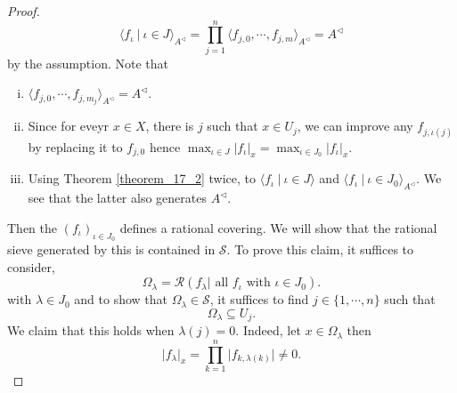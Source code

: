 \documentclass[8pt]{article}
\numberwithin{equation}{section}
\newcommand{\cR}[0]{\mathcal{R}}
\newcommand{\sep}[0]{\:|\:}
\newcommand{\ab}[1]{\vert #1 \vert}
\newcommand{\sS}[0]{\mathscr{S}}
\begin{document}
\begin{proof}
\begin{equation*}
        \langle f_\iota\sep \iota\in J\rangle_{A^\triangleleft} = \prod_{j=1}^n\langle f_{j,0},\cdots,f_{j,m}\rangle_{A^\triangleleft}=A^\triangleleft
    \end{equation*} 
    by the assumption. Note that 
    \begin{enumerate}[i.]
        \item $\langle f_{j,0},\cdots,f_{j,m_j}\rangle_{A^\triangleleft}=A^\triangleleft$.
        \item Since for eveyr $x\in X$, there is $j$ such that $x\in U_j$, we can improve any $f_{j,\iota(j)}$ by replacing it to $f_{j,0}$ hence $\max_{\iota\in J}\ab{f_\iota}_x = \max_{\iota\in J_0}\ab{f_\iota}_x$.
        \item Using Theorem \ref{theorem_17_2} twice, to $\langle f_\iota\sep \iota\in J\rangle$ and $\langle f_\iota\sep \iota\in J_0\rangle_{A^\triangleleft}$. We see that the latter also generates $A^\triangleleft$.%
    \end{enumerate}
    Then the $(f_\iota)_{\iota\in J_0}$ defines a rational covering. We will show that the rational sieve generated by this is contained in $\sS$. To prove this claim, it suffices to consider,
    \begin{equation*}
        \Omega_\lambda = \cR(f_\lambda|\text{ all $f_\iota$ with $\iota\in J_0$}).
    \end{equation*}
    with $\lambda\in J_0$ and to show that $\Omega_\lambda\in\sS$, it suffices to find $j\in\{1,\cdots,n\}$ such that 
    \begin{equation*}
        \Omega_\lambda\subseteq U_j.
    \end{equation*}
    We claim that this holds when $\lambda(j) = 0$. %
    Indeed, let $x\in\Omega_\lambda$ then 
    \begin{equation*}
        \ab{f_\lambda}_x = \prod_{k=1}^n\ab{f_{k,\lambda(k)}}\not=0.

\end{equation*}
\end{proof}
\end{document}
